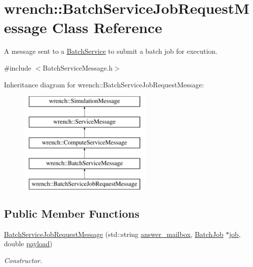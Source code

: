\hypertarget{classwrench_1_1_batch_service_job_request_message}{}\section{wrench\+:\+:Batch\+Service\+Job\+Request\+Message Class Reference}
\label{classwrench_1_1_batch_service_job_request_message}


A message sent to a \hyperlink{classwrench_1_1_batch_service}{Batch\+Service} to submit a batch job for execution.  




{\ttfamily \#include $<$Batch\+Service\+Message.\+h$>$}

Inheritance diagram for wrench\+:\+:Batch\+Service\+Job\+Request\+Message\+:\begin{figure}[H]
\begin{center}
\leavevmode
\includegraphics[height=5.000000cm]{classwrench_1_1_batch_service_job_request_message}
\end{center}
\end{figure}
\subsection*{Public Member Functions}
\begin{DoxyCompactItemize}
\item 
\hyperlink{classwrench_1_1_batch_service_job_request_message_a563be67cfe2b719c47ab3c54850b523e}{Batch\+Service\+Job\+Request\+Message} (std\+::string \hyperlink{classwrench_1_1_batch_service_job_request_message_acf4e18e89cd2419af5f5de0f08a32254}{answer\+\_\+mailbox}, \hyperlink{classwrench_1_1_batch_job}{Batch\+Job} $\ast$\hyperlink{classwrench_1_1_batch_service_job_request_message_ab1279040739326a80418e60cf6b80b05}{job}, double \hyperlink{classwrench_1_1_simulation_message_a914f2732713f7c02898e66f05a7cb8a1}{payload})
\begin{DoxyCompactList}\small\item\em Constructor. \end{DoxyCompactList}\end{DoxyCompactItemize}

